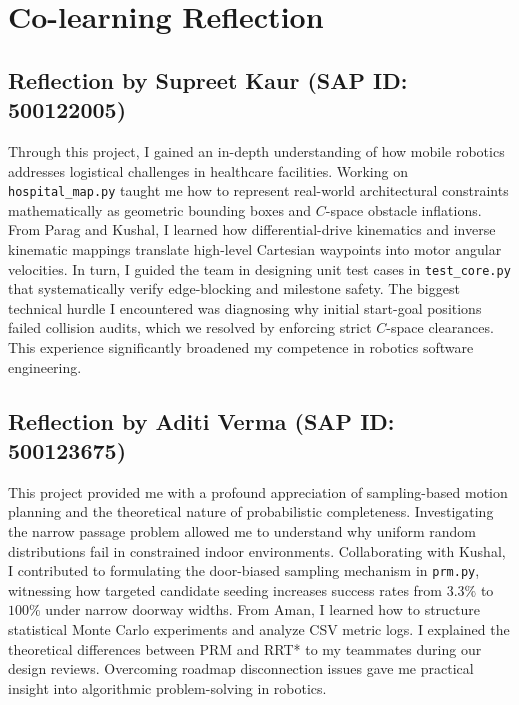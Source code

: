 \documentclass[12pt,a4paper]{article}
\begin{document}
\section{Co-learning Reflection}

\subsection*{Reflection by Supreet Kaur (SAP ID: 500122005)}
Through this project, I gained an in-depth understanding of how mobile robotics addresses logistical challenges in healthcare facilities. Working on \texttt{hospital\_map.py} taught me how to represent real-world architectural constraints mathematically as geometric bounding boxes and $C$-space obstacle inflations. From Parag and Kushal, I learned how differential-drive kinematics and inverse kinematic mappings translate high-level Cartesian waypoints into motor angular velocities. In turn, I guided the team in designing unit test cases in \texttt{test\_core.py} that systematically verify edge-blocking and milestone safety. The biggest technical hurdle I encountered was diagnosing why initial start-goal positions failed collision audits, which we resolved by enforcing strict $C$-space clearances. This experience significantly broadened my competence in robotics software engineering.

\subsection*{Reflection by Aditi Verma (SAP ID: 500123675)}
This project provided me with a profound appreciation of sampling-based motion planning and the theoretical nature of probabilistic completeness. Investigating the narrow passage problem allowed me to understand why uniform random distributions fail in constrained indoor environments. Collaborating with Kushal, I contributed to formulating the door-biased sampling mechanism in \texttt{prm.py}, witnessing how targeted candidate seeding increases success rates from $3.3\%$ to $100\%$ under narrow doorway widths. From Aman, I learned how to structure statistical Monte Carlo experiments and analyze CSV metric logs. I explained the theoretical differences between PRM and RRT* to my teammates during our design reviews. Overcoming roadmap disconnection issues gave me practical insight into algorithmic problem-solving in robotics.
\end{document}
